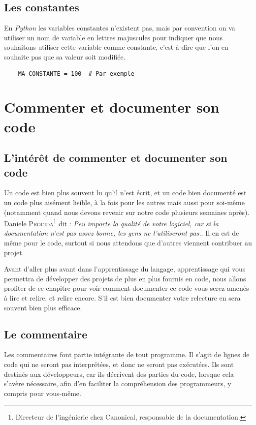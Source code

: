 \documentclass[a4paper,12pt]{book}
\begin{document}
\section{Les constantes}
En \textit{Python} les variables constantes n'existent pas, mais par convention on va utiliser un nom de variable en lettres majuscules pour indiquer que nous souhaitons utiliser cette variable comme constante, c'est-à-dire que l'on en souhaite pas que sa valeur soit modifiée.
\begin{verbatim}
    MA_CONSTANTE = 100  # Par exemple
\end{verbatim}
\medskip

\chapter{Commenter et documenter son code}
\section{L'intérêt de commenter et documenter son code}
Un code est bien plus souvent lu qu'il n'est écrit, et un code bien documenté est un code plus aisément lisible, à la fois pour les autres mais aussi pour soi-même (notamment quand nous devons revenir sur notre code plusieurs semaines après). Daniele \textsc{Procida}\footnote{Directeur de l'ingénierie chez Canonical, responsable de la documentation.} dit : \og \textit{Peu importe la qualité de votre logiciel, car si la documentation n'est pas assez bonne, les gens ne l'utiliseront pas.}\fg{}. Il en est de même pour le code, surtout si nous attendons que d'autres viennent contribuer au projet.
\medskip

Avant d'aller plus avant dans l'apprentissage du langage, apprentissage qui vous permettra de développer des projets de plus en plus fournis en code, nous allons profiter de ce chapitre pour voir comment documenter ce code vous serez amenés à lire et relire, et relire encore. S'il est bien documenter votre relecture en sera souvent bien plus efficace.
\medskip

\section{Le commentaire}
Les commentaires font partie intégrante de tout programme. Il s'agit de lignes de code qui ne seront pas interprétées, et donc ne seront pas exécutées. Ils sont destinés aux développeurs, car ils décrivent des parties du code, lorsque cela s'avère nécessaire, afin d'en faciliter la compréhension des programmeurs, y compris pour vous-même.
\medskip
\end{document}
